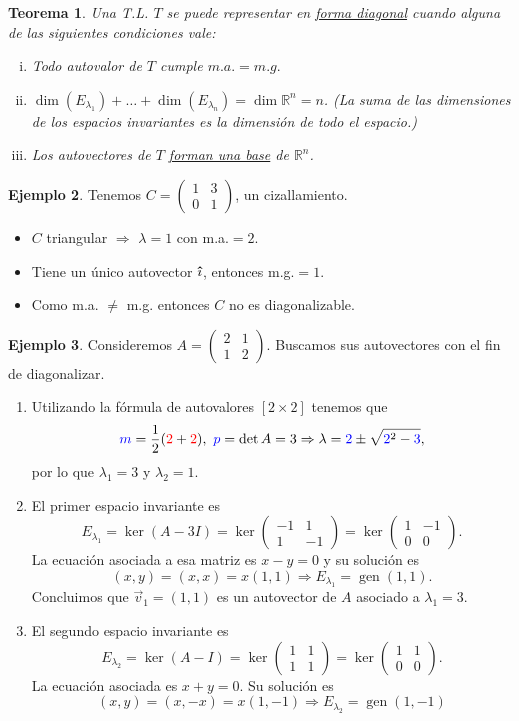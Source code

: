 \documentclass[12pt]{article}
\theoremstyle{plain}
\newtheorem{Th}{Teorema}  %
\theoremstyle{definition}
\newtheorem{Ex}[Th]{Ejemplo}           %
\theoremstyle{remark}
\DeclareMathOperator{\gen}{gen}     %
\newcommand{\la}{\lambda}           %
\newcommand{\ii}{\vu{\imath}}
\newcommand{\bR}{\mathbb{R}}        %
\newcommand{\x}{\times}             %
\renewcommand{\:}{\colon}           %
\newcommand{\un}[1]{\underline{#1}}
\renewcommand{\.}{\Cdot}                %
\newcommand{\twobytwo}[4]{\begin{pmatrix} %
    #1 & #2 \\ #3 & #4 \end{pmatrix}}
\newcommand{\To}{\Rightarrow}
\newcommand{\red}[1]{\textcolor{red}{#1}}
\newcommand{\blu}[1]{\textcolor{blue}{#1}}
\begin{document}
\begin{multicols}{2}
\begin{Th}
Una T.L. $T$ se puede representar en \un{forma diagonal} cuando alguna de las siguientes condiciones vale:
\vspace*{-0.5em}
\begin{enumerate}[i)]
  \itemsep=-0.4em
  \item Todo autovalor de $T$ cumple \un{$m.a.=m.g.$}
  \item $\dim(E_{\la_1})+\dots+\dim(E_{\la_n})=\dim\bR^n=n$. (La suma de las dimensiones de los espacios invariantes es la dimensión de todo el espacio.)
  \item Los autovectores de $T$ \un{forman una base} de $\bR^n$.
\end{enumerate}
\end{Th}

\begin{Ex} 
Tenemos $C=\twobytwo{1}{3}{0}{1}$, un cizallamiento. 
\begin{itemize}
  \itemsep=-0.5em
  \item $C$ triangular $\To$ $\la=1$ con m.a.$=2$.
  \item Tiene un único autovector $\ii$, entonces m.g.$=1$.
  \item Como m.a. $\neq$ m.g. entonces $C$ no es diagonalizable.
\end{itemize}
\end{Ex}
\vfill\null
\columnbreak
\begin{Ex}
  Consideremos $A=\twobytwo{2}{1}{1}{2}$. Buscamos sus autovectores con el fin de diagonalizar.
  \begin{enumerate}
    \itemsep=-0.5em
    \item Utilizando la fórmula de autovalores $[2\x 2]$ tenemos que 
    $$\blu{m}=\frac{1}{2}(\red{2}+\red{2}),\ \blu{p}=\det A=3\To \la=\blu{2}\pm\sqrt{\blu{2}^2-\blu{3}},$$
    por lo que $\la_1=3$ y $\la_2=1$.
    \item El primer espacio invariante es 
    $$E_{\la_1}=\ker(A-3I)=\ker\twobytwo{-1}{1}{1}{-1}=\ker\twobytwo{1}{-1}{0}{0}.$$
    La ecuación asociada a esa matriz es $x-y=0$ y su solución es 
    $$(x,y)=(x,x)=x(1,1)\To E_{\la_1}=\gen(1,1).$$
    Concluimos que $\vec{v}_1=(1,1)$ es un autovector de $A$ asociado a $\la_1=3$.
    \item El segundo espacio invariante es 
    $$E_{\la_2}=\ker(A-I)=\ker\twobytwo{1}{1}{1}{1}=\ker\twobytwo{1}{1}{0}{0}.$$
    La ecuación asociada es $x+y=0$. Su solución es 
    $$(x,y)=(x,-x)=x(1,-1)\To E_{\la_2}=\gen(1,-1)$$

\end{enumerate}
\end{Ex}
\end{multicols}
\end{document}
